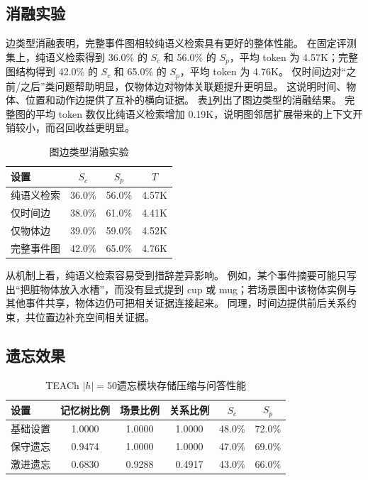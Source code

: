 \documentclass{cjc}
\begin{document}
\subsection{消融实验}

边类型消融表明，完整事件图相较纯语义检索具有更好的整体性能。
在固定评测集上，纯语义检索得到 36.0\% 的 $S_c$ 和 56.0\% 的 $S_p$，平均 token 为 4.57K；完整图结构得到 42.0\% 的 $S_c$ 和 65.0\% 的 $S_p$，平均 token 为 4.76K。
仅时间边对“之前/之后”类问题帮助明显，仅物体边对物体关联题提升更明显。
这说明时间、物体、位置和动作边提供了互补的横向证据。
表\ref{tab:ablation}列出了图边类型的消融结果。
完整图的平均 token 数仅比纯语义检索增加 0.19K，说明图邻居扩展带来的上下文开销较小，而召回收益更明显。

\begin{table}[t]
  \centering
  \caption{图边类型消融实验}
  \label{tab:ablation}
  \small
  \begin{tabular}{lccc}
    \toprule
    设置 & $S_c$ & $S_p$ & $T$ \\
    \midrule
    纯语义检索 & 36.0\% & 56.0\% & 4.57K \\
    仅时间边 & 38.0\% & 61.0\% & 4.41K \\
    仅物体边 & 39.0\% & 59.0\% & 4.52K \\
    完整事件图 & 42.0\% & 65.0\% & 4.76K \\
    \bottomrule
  \end{tabular}
\end{table}

从机制上看，纯语义检索容易受到措辞差异影响。
例如，某个事件摘要可能只写出“把脏物体放入水槽”，而没有显式提到 cup 或 mug；若场景图中该物体实例与其他事件共享，物体边仍可把相关证据连接起来。
同理，时间边提供前后关系约束，共位置边补充空间相关证据。

\subsection{遗忘效果}

\begin{table}[t]
  \centering
  \caption{TEACh $|h|=50$遗忘模块存储压缩与问答性能}
  \label{tab:forgetting}
  \small
  \begin{tabular}{lccccc}
    \toprule
    设置 & 记忆树比例 & 场景比例 & 关系比例 & $S_c$ & $S_p$ \\
    \midrule
    基础设置 & 1.0000 & 1.0000 & 1.0000 & 48.0\% & 72.0\% \\
    保守遗忘 & 0.9474 & 1.0000 & 1.0000 & 47.0\% & 69.0\% \\
    激进遗忘 & 0.6830 & 0.9288 & 0.4917 & 43.0\% & 66.0\% \\
    \bottomrule
  \end{tabular}
\end{table}
\end{document}
